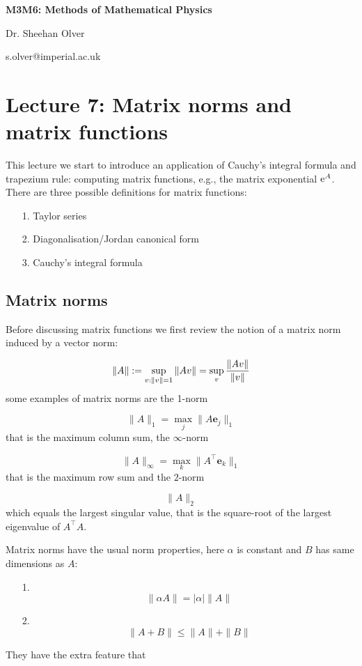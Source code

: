\documentclass[12pt,a4paper]{article}
\def\E{ {\rm e} }
\def\vc#1{ {\mathbf #1} }
\begin{document}
\textbf{M3M6: Methods of Mathematical Physics}

Dr. Sheehan Olver

s.olver@imperial.ac.uk

\section{Lecture 7: Matrix norms and matrix functions}
This lecture we start to introduce an application of Cauchy's integral formula and trapezium rule: computing matrix functions, e.g., the matrix exponential $\E^A$. There are three possible definitions for matrix functions:

\begin{itemize}
\item[1. ] Taylor series


\item[2. ] Diagonalisation/Jordan canonical form


\item[3. ] Cauchy's integral formula

\end{itemize}
\subsection{Matrix norms}
Before discussing matrix functions we first review the notion of a matrix norm induced by a vector norm:

\[
\| A\| := \sup_{v : \| v \| = 1} \| A v\| = \sup_{v } {\| A v\| \over \| v\|}
\]
some examples of matrix norms are the 1-norm

\[
\|A \|_1 = \max_j \|A \vc e_j\|_1
\]
that is the maximum column sum, the $\infty$-norm

\[
\|A \|_\infty = \max_k \|A^\top \vc e_k\|_1
\]
that is the maximum row sum and the $2$-norm

\[
\|A \|_2
\]
which equals the largest singular value, that is the square-root of the largest eigenvalue of $A^\top A$.

Matrix norms have the usual norm properties, here  $\alpha$ is constant and $B$ has same dimensions as $A$:

\begin{itemize}
\item[1. ] \[
\|\alpha A\| = |\alpha| \| A \|
\]

\item[2. ] \[
\| A + B \| \leq \|A \| + \|B \|
\]
\end{itemize}
They have the extra feature that
\end{document}
